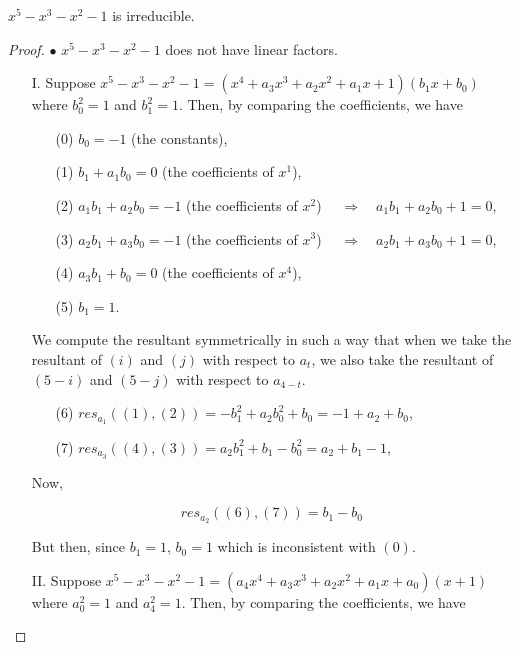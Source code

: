 \documentclass[10pt,a4paper]{amsart}
\begin{document}
\begin{ex} \label{ex:2}
$x^5-x^3-x^2-1$ is irreducible.
\end{ex} 

\begin{proof}
$\bullet$ $x^5-x^3-x^2-1$ does not have linear factors.
\begin{enumerate} 
\item[I.] Suppose $x^5-x^3-x^2-1=(x^4+a_3 x^3+a_2 x^2+a_1 x+1)(b_1 x+b_0)$ where $b_0^2=1$ and $b_1^2=1$. 
Then, by comparing the coefficients, we have

\begin{enumerate}
\item[(0)] $b_0=-1$ (the constants), \\
\item[(1)] $b_1+a_1 b_0=0$ (the coefficients of $x^1$), \\
\item[(2)] $a_1 b_1+a_2 b_0=-1$ (the coefficients of $x^2$) $\quad \Rightarrow \quad a_1 b_1+a_2 b_0+1=0$,\\
\item[(3)] $a_2 b_1+a_3 b_0=-1$ (the coefficients of $x^3$) $\quad \Rightarrow \quad a_2 b_1+a_3 b_0+1=0$, \\
\item[(4)] $a_3 b_1+b_0=0$ (the coefficients of $x^4$), \\
\item[(5)] $b_1=1$.
\end{enumerate}


We compute the resultant symmetrically in such a way that when we take the resultant of $(i)$ and $(j)$ with respect to $a_{t}$, we also take the resultant of $(5-i)$ and $(5-j)$ with respect to $a_{4-t}$.

\begin{enumerate}
\item[(6)] $res_{a_1}((1),(2))=-b_1^2+a_2b_0^2+b_0=-1+a_2+b_0$,
\item[(7)] $res_{a_3}((4),(3))=a_2 b_1^2+b_1-b_0^2=a_2+b_1-1$,
\end{enumerate}

Now,

\begin{equation*}
res_{a_2}((6),(7))=b_1-b_0
\end{equation*}

But then, since $b_1=1$, $b_0=1$ which is inconsistent with $(0)$.
\item[II.] Suppose $x^5-x^3-x^2-1=(a_4x^4+a_3 x^3+a_2 x^2+a_1 x+a_0)(x+1)$ where $a_0^2=1$ and $a_4^2=1$. 
Then, by comparing the coefficients, we have


\end{enumerate}
\end{proof}
\end{document}

